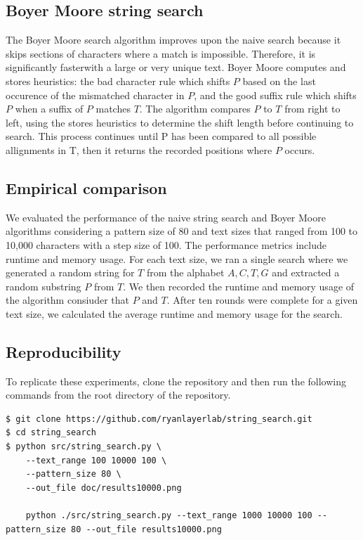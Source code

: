 \documentclass[11pt, letterpaper]{article}
\begin{document}
\subsection{Boyer Moore string search}
The Boyer Moore search algorithm improves upon the naive search because it 
skips sections of characters where a match is impossible. Therefore, it is 
significantly fasterwith a large or very unique text. Boyer Moore computes 
and stores heuristics: the bad character rule which shifts $P$ based on the 
last occurence of the mismatched character in $P$, and the good suffix rule 
which shifts $P$ when a suffix of $P$ matches $T$. The algorithm compares $P$ 
to $T$ from right to left, using the stores heuristics to determine the shift 
length before continuing to search. This process continues until P has been 
compared to all possible allignments in T, then it returns the recorded 
positions where $P$ occurs.

\subsection{Empirical comparison}
We evaluated the performance of the naive string search and Boyer Moore 
algorithms considering a pattern size of 80 and text sizes that ranged 
from 100 to 10,000 characters with a step size of 100.  The performance 
metrics include runtime and memory usage. For each text size, we ran a 
single search where we generated a random string for $T$ from the alphabet 
${A, C, T, G}$ and extracted a random substring $P$ from $T$. We then 
recorded the runtime and memory usage of the algorithm consiuder that $P$ 
and $T$. After ten rounds were complete for a given text size, we calculated 
the average runtime and memory usage for the search.

\subsection{Reproducibility}
To replicate these experiments, clone the repository and then run the
following commands from the root directory of the repository.

\begin{verbatim}
$ git clone https://github.com/ryanlayerlab/string_search.git
$ cd string_search
$ python src/string_search.py \
    --text_range 100 10000 100 \
    --pattern_size 80 \
    --out_file doc/results10000.png

    python ./src/string_search.py --text_range 1000 10000 100 --pattern_size 80 --out_file results10000.png
\end{verbatim}
\end{document}
